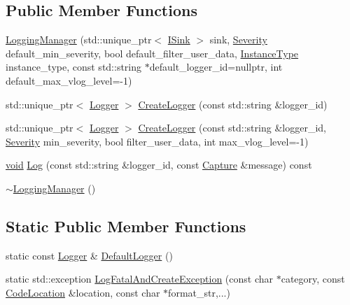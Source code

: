 \subsection*{Public Member Functions}
\begin{DoxyCompactItemize}
\item 
\mbox{\hyperlink{classonnxruntime_1_1logging_1_1LoggingManager_ae088e9104f76dd12ce446bed84d734a4}{Logging\+Manager}} (std\+::unique\+\_\+ptr$<$ \mbox{\hyperlink{classonnxruntime_1_1logging_1_1ISink}{I\+Sink}} $>$ sink, \mbox{\hyperlink{namespaceonnxruntime_1_1logging_a7daeb33e1b0e6a6df8c23d142af78e81}{Severity}} default\+\_\+min\+\_\+severity, bool default\+\_\+filter\+\_\+user\+\_\+data, \mbox{\hyperlink{classonnxruntime_1_1logging_1_1LoggingManager_af3489102aaa98cc9b30fcd5ac641eef6}{Instance\+Type}} instance\+\_\+type, const std\+::string $\ast$default\+\_\+logger\+\_\+id=nullptr, int default\+\_\+max\+\_\+vlog\+\_\+level=-\/1)
\item 
std\+::unique\+\_\+ptr$<$ \mbox{\hyperlink{classonnxruntime_1_1logging_1_1Logger}{Logger}} $>$ \mbox{\hyperlink{classonnxruntime_1_1logging_1_1LoggingManager_a0060fb2bb4d5830fce54cf312ce308bb}{Create\+Logger}} (const std\+::string \&logger\+\_\+id)
\item 
std\+::unique\+\_\+ptr$<$ \mbox{\hyperlink{classonnxruntime_1_1logging_1_1Logger}{Logger}} $>$ \mbox{\hyperlink{classonnxruntime_1_1logging_1_1LoggingManager_a9029481638625330691349c45085bf2b}{Create\+Logger}} (const std\+::string \&logger\+\_\+id, \mbox{\hyperlink{namespaceonnxruntime_1_1logging_a7daeb33e1b0e6a6df8c23d142af78e81}{Severity}} min\+\_\+severity, bool filter\+\_\+user\+\_\+data, int max\+\_\+vlog\+\_\+level=-\/1)
\item 
\mbox{\hyperlink{mlasi_8h_a88f941d423cb2a819b70a1358982b1a6}{void}} \mbox{\hyperlink{classonnxruntime_1_1logging_1_1LoggingManager_a3aa5d44bfb4df7f535a4cf4478a00248}{Log}} (const std\+::string \&logger\+\_\+id, const \mbox{\hyperlink{classonnxruntime_1_1logging_1_1Capture}{Capture}} \&message) const
\item 
\mbox{\hyperlink{classonnxruntime_1_1logging_1_1LoggingManager_af991a7ada953f9be436bc2089503e90a}{$\sim$\+Logging\+Manager}} ()
\end{DoxyCompactItemize}
\subsection*{Static Public Member Functions}
\begin{DoxyCompactItemize}
\item 
static const \mbox{\hyperlink{classonnxruntime_1_1logging_1_1Logger}{Logger}} \& \mbox{\hyperlink{classonnxruntime_1_1logging_1_1LoggingManager_a8b2e364282876c313a953e4f81647cc2}{Default\+Logger}} ()
\item 
static std\+::exception \mbox{\hyperlink{classonnxruntime_1_1logging_1_1LoggingManager_ae0a7438714587b804d34dbc656911216}{Log\+Fatal\+And\+Create\+Exception}} (const char $\ast$category, const \mbox{\hyperlink{structonnxruntime_1_1CodeLocation}{Code\+Location}} \&location, const char $\ast$format\+\_\+str,...)
\end{DoxyCompactItemize}


